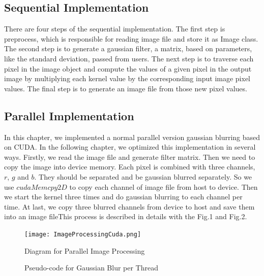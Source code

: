 \documentclass[journal,12pt,onecolumn,draftclsnofoot]{ieeeconf}  %
\begin{document}
\subsection{Sequential  Implementation}
There are four steps of the sequential implementation. The first step is preprocess, which is responsible for reading image file and store it as Image class. The second step is to generate a gaussian filter, a matrix, based on parameters, like the standard deviation,  passed from users. The next step is to traverse each pixel in the image object and compute the values of a given pixel in the output image by multiplying each kernel value by the corresponding input image pixel values. The final step is to generate an image file from those new pixel values.

\subsection{Parallel  Implementation}
In this chapter, we implemented a normal parallel version gaussian blurring based on CUDA. In the following chapter, we optimized this implementation in several ways.  Firstly, we read the image file and generate filter matrix. Then we need to copy the image into device memory. Each pixel is combined with three channels, $r$, $g$ and $b$.  They should be separated and be gaussian blurred separately. So we use $cudaMemcpy2D$ to copy each channel of image file from host to device. Then we start the kernel three times and do gaussian blurring to each channel per time.  At last, we copy three blurred channels from device to host and save them into an image fileThis process is described in details with the Fig.1 and Fig.2.


\begin{figure}[h]
	\centering\texttt{[image: ImageProcessingCuda.png]}
	\caption{Diagram for Parallel Image Processing}
	\label{parallel}
\end{figure}

\begin{figure}[htbp]
\begin{center}
\end{center}
  \caption{Pseudo-code for Gaussian Blur per Thread}
\end{figure}
\end{document}
